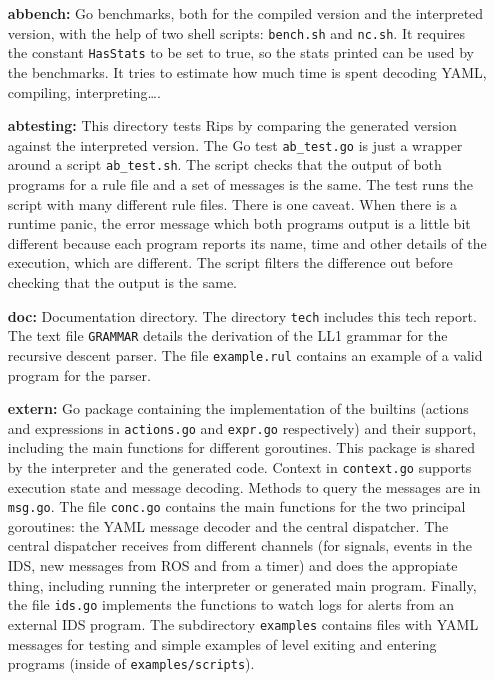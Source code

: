 \documentclass[a4paper]{article}
\begin{document}
\begin{itemize}

\item[\textbf{abbench:}] Go benchmarks, both for the compiled version
and the interpreted version, with the help of two shell scripts: \texttt{bench.sh} and
\texttt{nc.sh}. It requires the constant \verb+HasStats+ to be set to true,
so the stats printed can be used by the benchmarks. It tries to estimate
how much time is spent decoding YAML, compiling, interpreting\ldots.

\item[\textbf{abtesting:}] This directory tests Rips by comparing the generated
version against the interpreted version. The Go test \texttt{ab\_test.go}
is just a wrapper around a script \texttt{ab\_test.sh}. The script
checks that the output of both programs for a rule file and a set of
messages is the same. The test runs the script with many different
rule files.
There is one caveat. When there
is a runtime panic, the error message which both programs output
is a little bit different because
each program reports its name, time and other details of the execution,
which are different. The script
filters the difference out before checking that the output is the same.

\item[\textbf{doc:}] Documentation directory. The directory \texttt{tech}
includes this tech report. The text file \texttt{GRAMMAR} details the
derivation of the LL1 grammar for the recursive descent parser. The
file \texttt{example.rul} contains an example of a valid program
for the parser.

\item[\textbf{extern:}] Go package containing
the implementation of the builtins (actions and expressions in
\texttt{actions.go} and \texttt{expr.go} respectively) and their
support, including the main functions for different goroutines.
This package is shared by the interpreter and the generated code.
Context in \texttt{context.go}  supports execution state and message
decoding. Methods to query the messages are in \texttt{msg.go}.
The file \texttt{conc.go} contains the main functions for the two principal
goroutines: the YAML message decoder and the central dispatcher.
The central dispatcher receives from different channels (for signals, events
in the IDS, new messages from ROS and from a timer) and does the
appropiate thing, including running the interpreter or generated main program.
Finally, the file \texttt{ids.go} implements the functions to watch logs for
alerts from an external IDS program.
The subdirectory \texttt{examples} contains files with YAML messages
for testing and simple examples of level exiting and entering programs
(inside of \texttt{examples/scripts}).



\end{itemize}
\end{document}
